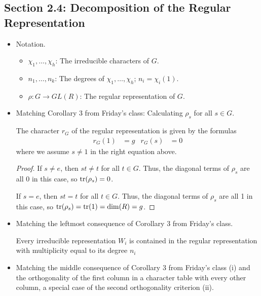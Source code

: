 \documentclass[../notes.tex]{subfiles}
\begin{document}
\subsection*{Section 2.4: Decomposition of the Regular Representation}
\begin{itemize}
    \item Notation.
    \begin{itemize}
        \item $\chi_1,\dots,\chi_h$: The irreducible characters of $G$.
        \item $n_1,\dots,n_k$: The degrees of $\chi_1,\dots,\chi_h$; $n_i=\chi_i(1)$.
        \item $\rho:G\to GL(R)$: The regular representation of $G$.
    \end{itemize}
    \item Matching Corollary 3 from Friday's class: Calculating $\rho_s$ for all $s\in G$.
    \begin{proposition}\label{prp:regRepChar}
        The character $r_G$ of the regular representation is given by the formulas
        \begin{align*}
            r_G(1) &= g&
            r_G(s) &= 0
        \end{align*}
        where we assume $s\neq 1$ in the right equation above.
        \begin{proof}
            If $s\neq e$, then $st\neq t$ for all $t\in G$. Thus, the diagonal terms of $\rho_s$ are all 0 in this case, so $\tr(\rho_s)=0$.\par
            If $s=e$, then $st=t$ for all $t\in G$. Thus, the diagonal terms of $\rho_s$ are all 1 in this case, so $\tr(\rho_s)=\tr(1)=\dim(R)=g$.
        \end{proof}
    \end{proposition}
    \item Matching the leftmost consequence of Corollary 3 from Friday's class.
    \setcounter{corollary}{0}
    \begin{corollary}\label{cly:regularDsum}
        Every irreducible representation $W_i$ is contained in the regular representation with multiplicity equal to its degree $n_i$
    \end{corollary}
    \item Matching the middle consequence of Corollary 3 from Friday's class (i) and the orthogonality of the first column in a character table with every other column, a special case of the second orthogonality criterion (ii).
    \begin{corollary}\label{cly:columnOrtho}

\end{corollary}
\end{itemize}
\end{document}
